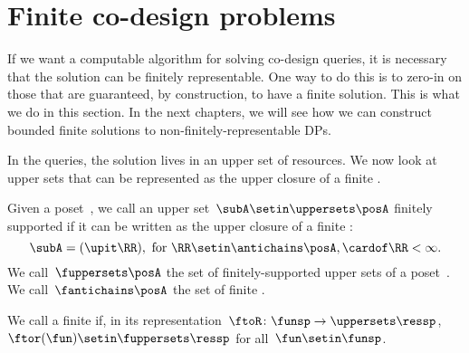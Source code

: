 \section{Finite co-design problems}

If we want a computable algorithm for solving co-design queries, it is necessary that the solution can be finitely representable.
One way to do this is to zero-in on those  that are guaranteed, by construction, to have a finite solution.
This is what we do in this section.
In the next chapters, we will see how we can construct bounded finite solutions to non-finitely-representable DPs.

In the \FixFunMinRes queries, the solution lives in an upper set of resources.
We now look at upper sets that can be represented as the upper closure of a finite .

\begin{definition}
    \label{def:fuppersets}
    Given a poset~\posA, we call an upper set~$\subA \setin \uppersets \posA$ finitely supported
    if it can be written as the upper closure of a finite :
    \begin{equation}
        \subA = (\upit\RR), \text{ for } \RR \setin \antichains \posA, \cardof\RR < \infty.
    \end{equation}
    We call~$\fuppersets \posA$ the set of finitely-supported upper sets of a poset~\posA.
    \\
    We call~$\fantichains \posA$ the set of finite .
\end{definition}

\begin{definition}
    \label{def:finite_des_prob}
    We call a  finite if, in its representation~$\ftoR \colon \funsp \to \uppersets \ressp$,
    ~$\ftor(\fun) \setin \fuppersets\ressp$ for all~$\fun\setin\funsp$.
\end{definition}

